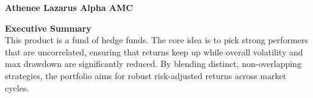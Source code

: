\documentclass[11pt]{article}
\begin{document}

{\Huge \bfseries \color{accent} Athenee Lazarus Alpha AMC}\\[2.5em]

\begin{tcolorbox}[boxrule=0pt, leftrule=4pt, colframe=primary, colback=cardbg, sharp corners]
\textbf{\large Executive Summary} \\[4pt]
This product is a fund of hedge funds. The core idea is to pick strong performers that are uncorrelated, ensuring that returns keep up while overall volatility and max drawdown are significantly reduced. By blending distinct, non-overlapping strategies, the portfolio aims for robust risk-adjusted returns across market cycles.
\end{tcolorbox}
\end{document}
